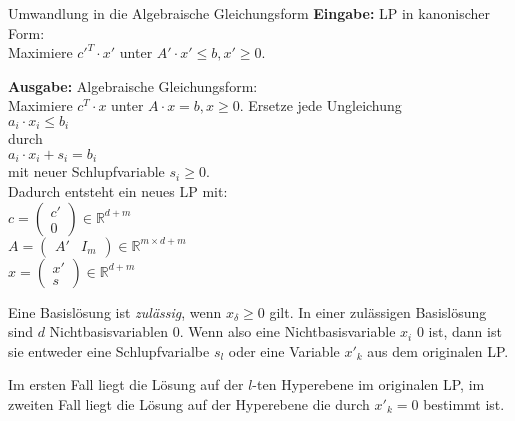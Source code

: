 \documentclass{panikzettel}
\begin{document}
\begin{halfboxr}
\vspace{-\baselineskip}
\begin{algo}{Umwandlung in die Algebraische Gleichungsform}
\textbf{Eingabe:} LP in kanonischer Form: \\
\-\hspace{1em} Maximiere ${c'}^T \cdot x'$ unter {\footnotesize $A' \cdot x' \leq b, x' \geq 0$}.

\textbf{Ausgabe:} Algebraische Gleichungsform: \\
\-\hspace{1em} Maximiere $c^T \cdot x$ unter $A \cdot x = b, x \geq 0$.
\tcblower
Ersetze jede Ungleichung \\
\-\hspace{1em} $a_i \cdot x_i \leq b_i$ \\
durch \\
\-\hspace{1em} $a_i \cdot x_i + s_i = b_i$ \\
mit neuer Schlupfvariable $s_i \geq 0$. \\
Dadurch entsteht ein neues LP mit: \\
\-\hspace{1em} $c= \begin{pmatrix} c' \\ 0 \end{pmatrix} \in \mathbb{R}^{d+m}$ \\
\-\hspace{1em} $A = \begin{pmatrix} A' & I_m \end{pmatrix} \in \mathbb{R}^{m \times d+m}$ \\
\-\hspace{1em} $x = \begin{pmatrix} x' \\ s \end{pmatrix} \in \mathbb{R}^{d+m}$
\end{algo}
\end{halfboxr}

Eine Basislösung ist \emph{zulässig}, wenn $x_{\delta} \geq 0$ gilt.
In einer zulässigen Basislösung sind $d$ Nichtbasisvariablen $0$. Wenn also eine Nichtbasisvariable $x_i$ $0$ ist, dann ist sie entweder eine Schlupfvarialbe $s_l$ oder eine Variable $x'_k$ aus dem originalen LP.

Im ersten Fall liegt die Lösung auf der $l$-ten Hyperebene im originalen LP, im zweiten Fall liegt die Lösung auf der Hyperebene die durch $x'_k = 0$ bestimmt ist.
\end{document}
